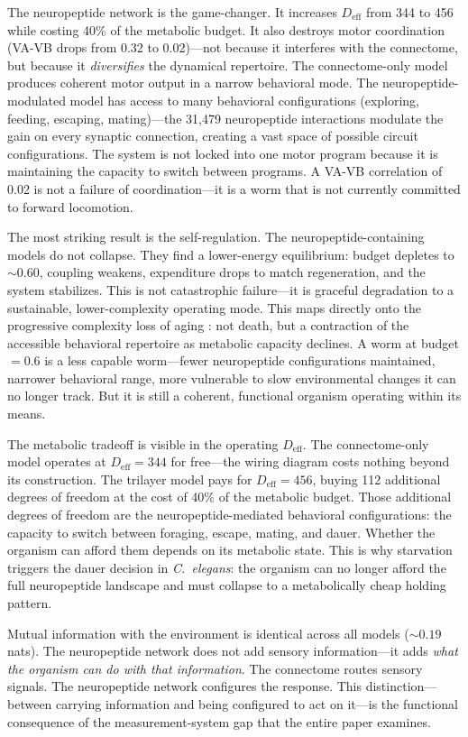 \documentclass[12pt]{article}
\newcommand{\Deff}{D_{\mathrm{eff}}}
\begin{document}
The neuropeptide network is the game-changer. It increases $\Deff$ from 344 to 456 while costing 40\% of the metabolic budget. It also destroys motor coordination (VA-VB drops from 0.32 to 0.02)---not because it interferes with the connectome, but because it \textit{diversifies} the dynamical repertoire. The connectome-only model produces coherent motor output in a narrow behavioral mode. The neuropeptide-modulated model has access to many behavioral configurations (exploring, feeding, escaping, mating)---the 31{,}479 neuropeptide interactions modulate the gain on every synaptic connection, creating a vast space of possible circuit configurations. The system is not locked into one motor program because it is maintaining the capacity to switch between programs. A VA-VB correlation of 0.02 is not a failure of coordination---it is a worm that is not currently committed to forward locomotion.

The most striking result is the self-regulation. The neuropeptide-containing models do not collapse. They find a lower-energy equilibrium: budget depletes to ${\sim}0.60$, coupling weakens, expenditure drops to match regeneration, and the system stabilizes. This is not catastrophic failure---it is graceful degradation to a sustainable, lower-complexity operating mode. This maps directly onto the progressive complexity loss of aging \cite{cohen2022}: not death, but a contraction of the accessible behavioral repertoire as metabolic capacity declines. A worm at budget $= 0.6$ is a less capable worm---fewer neuropeptide configurations maintained, narrower behavioral range, more vulnerable to slow environmental changes it can no longer track. But it is still a coherent, functional organism operating within its means.

The metabolic tradeoff is visible in the operating $\Deff$. The connectome-only model operates at $\Deff = 344$ for free---the wiring diagram costs nothing beyond its construction. The trilayer model pays for $\Deff = 456$, buying 112 additional degrees of freedom at the cost of 40\% of the metabolic budget. Those additional degrees of freedom are the neuropeptide-mediated behavioral configurations: the capacity to switch between foraging, escape, mating, and dauer. Whether the organism can afford them depends on its metabolic state. This is why starvation triggers the dauer decision in \textit{C.~elegans}: the organism can no longer afford the full neuropeptide landscape and must collapse to a metabolically cheap holding pattern.

Mutual information with the environment is identical across all models (${\sim}0.19$ nats). The neuropeptide network does not add sensory information---it adds \textit{what the organism can do with that information}. The connectome routes sensory signals. The neuropeptide network configures the response. This distinction---between carrying information and being configured to act on it---is the functional consequence of the measurement-system gap that the entire paper examines.
\end{document}
